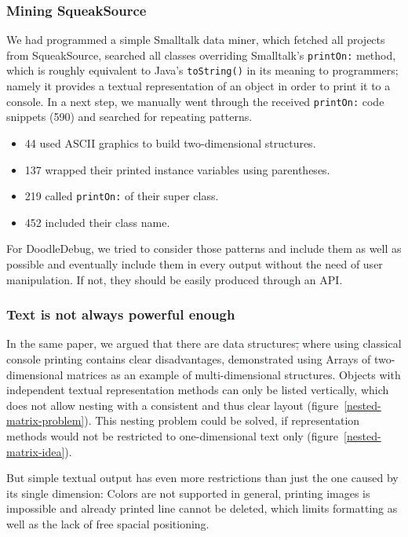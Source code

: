 \documentclass[english]{acm_proc_article-sp}
\newcommand{\del}[1]{\textcolor{red}{\sout{#1}}} %
\newcommand{\del}[1]{} %
\begin{document}
\subsubsection{Mining SqueakSource}
We had programmed a simple Smalltalk data miner, which fetched all projects from SqueakSource, searched all classes overriding Smalltalk's \verb.printOn:. method, which is roughly equivalent to Java's \verb.toString(). in its meaning to programmers; namely it provides a textual representation of an object in order to print it to a console. In a next step, we manually went through the received \verb.printOn:. code snippets (590) and searched for repeating patterns.
\begin{itemize}
	\item 44 used ASCII graphics to build two-dimensional structures.
	\item 137 wrapped their printed instance variables using parentheses.
	\item 219 called \verb.printOn:. of their super class.
	\item 452 included their class name.
\end{itemize}
For DoodleDebug, we tried to consider those patterns and include them as well as possible and eventually include them in every output without the need of user manipulation. If not, they should be easily produced through an API.

\subsubsection{Text is not always powerful enough}
In the same paper, we argued that there are data structures\del{,} where using classical console printing contains clear disadvantages, demonstrated using Arrays of two-dimensional matrices as an example of multi-dimensional structures. Objects with independent textual representation methods can only be listed vertically, which does not allow nesting with a consistent and thus clear layout (figure~\ref{nested-matrix-problem}). This nesting problem could be solved, if representation methods would not be restricted to one-dimensional text only (figure~\ref{nested-matrix-idea}).

But simple textual output has even more restrictions than just the one caused by its single dimension: Colors are not supported in general, printing images is impossible and already printed line cannot be deleted, which limits formatting as well as the lack of free spacial positioning.
\end{document}
